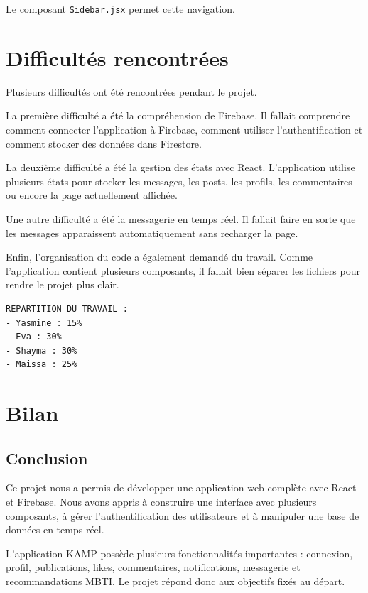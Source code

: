\documentclass[a4paper, 12pt, twoside]{article}
\begin{document}
Le composant \texttt{Sidebar.jsx} permet cette navigation.

\section{Difficultés rencontrées}

Plusieurs difficultés ont été rencontrées pendant le projet.

La première difficulté a été la compréhension de Firebase. 
Il fallait comprendre comment connecter l'application à Firebase, comment utiliser l'authentification et comment stocker des données dans Firestore.

La deuxième difficulté a été la gestion des états avec React. 
L'application utilise plusieurs états pour stocker les messages, les posts, les profils, les commentaires ou encore la page actuellement affichée.

Une autre difficulté a été la messagerie en temps réel. 
Il fallait faire en sorte que les messages apparaissent automatiquement sans recharger la page.

Enfin, l'organisation du code a également demandé du travail. 
Comme l'application contient plusieurs composants, il fallait bien séparer les fichiers pour rendre le projet plus clair.

\begin{lstlisting}
REPARTITION DU TRAVAIL :
- Yasmine : 15%
- Eva : 30%
- Shayma : 30%
- Maissa : 25%

\end{lstlisting}

\section{Bilan}

\subsection{Conclusion}

Ce projet nous a permis de développer une application web complète avec React et Firebase. 
Nous avons appris à construire une interface avec plusieurs composants, à gérer l'authentification des utilisateurs et à manipuler une base de données en temps réel.

L'application KAMP possède plusieurs fonctionnalités importantes : connexion, profil, publications, likes, commentaires, notifications, messagerie et recommandations MBTI. 
Le projet répond donc aux objectifs fixés au départ.
\end{document}
